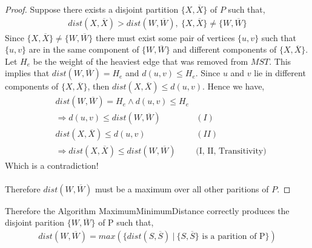 \documentclass[12pt]{article}
\newenvironment{lemma}[2][Lemma]{\begin{trivlist}
\item[\hskip \labelsep {\bfseries #1}\hskip \labelsep {\bfseries #2.}]}{\end{trivlist}}
\newenvironment{question}[2][Question]{\begin{trivlist}
\item[\hskip \labelsep {\bfseries #1}\hskip \labelsep {\bfseries #2.}]}{\end{trivlist}}
\begin{document}
\begin{question}{3}
\begin{lemma}{3.1}
    \begin{proof}
      Suppose there exists a disjoint partition $\{X, \overline{X}\}$ of $P$ such
      that,
      \begin{align*}
        dist(X, \overline{X}) > dist(W, \overline{W}),\ \{X, \overline{X}\} \neq \{W, \overline{W}\}
      \end{align*}
      Since $\{X, \overline{X}\} \neq \{W, \overline{W}\}$
      there must exist some pair of vertices $\{u, v\}$ such that $\{u, v\}$
      are in the same component of $\{W, \overline{W}\}$ and different
      components of $\{X, \overline{X}\}$.
      Let $H_{e}$ be the weight of the heaviest edge that was removed from $MST$.
      This implies that $dist(W, \overline{W}) = H_{e}$ and $d(u, v) \leq H_{e}$.
      Since $u$ and $v$ lie in different components of $\{X, \overline{X}\}$, then
      $dist(X, \overline{X}) \leq d(u, v)$.  Hence we have,
      \begin{align*}
        & dist(W, \overline{W}) = H_{e} \land d(u, v) \leq H_{e} & \\
        & \Rightarrow d(u, v) \leq dist(W, \overline{W}) & (I) \\
        & dist(X, \overline{X}) \leq d(u, v) & (II) \\
        & \Rightarrow dist(X, \overline{X}) \leq dist(W, \overline{W}) & \text{(I, II, Transitivity)}
      \end{align*}
      Which is a contradiction!\\ \\
      Therefore $dist(W, \overline{W})$ must be a maximum over all other paritions of $P$.
    \end{proof}

    Therefore the Algorithm MaximumMinimumDistance correctly produces the disjoint
    parition $\{W, \overline{W}\}$ of P such that,
    \begin{align*}
      dist(W, \overline{W}) = max(\{dist(S, \overline{S})\ |\ \{S, \overline{S}\} \text{ is a parition of P}\})
    \end{align*}
  \end{lemma}


\end{question}
\end{document}
